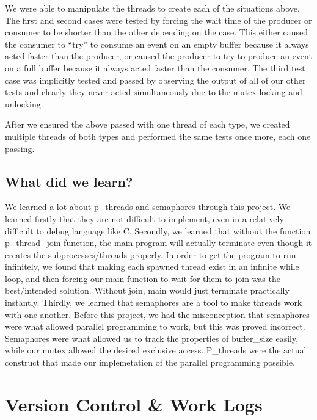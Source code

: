 \documentclass{article}
\begin{document}
We were able to manipulate the threads to create each of the situations above. The first and second cases were tested by forcing the wait time of the producer or consumer to be shorter than the other depending on the case. This either caused the consumer to “try” to consume an event on an empty buffer because it always acted faster than the producer, or caused the producer to try to produce an event on a full buffer because it always acted faster than the consumer. The third test case was implicitly tested and passed by observing the output of all of our other tests and clearly they never acted simultaneously due to the mutex locking and unlocking.

After we ensured the above passed with one thread of each type, we created multiple threads of both types and performed the same tests once more, each one passing.

\subsection{What did we learn?}

We learned a lot about p\_threads and semaphores through this project. We learned firstly that they are not difficult to implement, even in a relatively difficult to debug language like C. Secondly, we learned that without the function p\_thread\_join function, the main program will actually terminate even though it creates the subprocesses/threads properly. In order to get the program to run infinitely, we found that making each spawned thread exist in an infinite while loop, and then forcing our main function to wait for them to join was the best/intended solution. Without join, main would just terminate practically instantly. Thirdly, we learned that semaphores are a tool to make threads work with one another. Before this project, we had the misconception that semaphores were what allowed parallel programming to work, but this was proved incorrect. Semaphores were what allowed us to track the properties of buffer\_size easily, while our mutex allowed the desired exclusive access. P\_threads were the actual construct that made our implemetation of the parallel programming possible.

\section{Version Control \& Work Logs}
\end{document}

